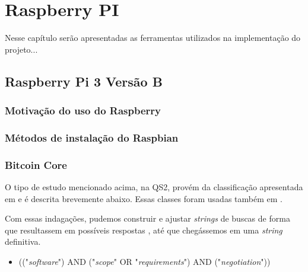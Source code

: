\chapter{Raspberry PI}\label{cap:revisao}

Nesse capítulo serão apresentadas as ferramentas utilizados na implementação do projeto...

\section{Raspberry Pi 3 Versão B}


\subsection{Motivação do uso do Raspberry}


\subsection{Métodos de instalação do Raspbian}


\subsection{Bitcoin Core}


O tipo de estudo mencionado acima, na QS2, provém da classificação apresentada
em \cite{wieringa2006requirements} e é descrita brevemente abaixo. Essas classes
foram usadas também em \cite{Kuhrmann:2015:SPI:2785592.2785600}.
  


Com essas indagações, pudemos construir e ajustar \textit{strings} de buscas de
forma que resultassem em possíveis respostas , até que chegássemos em uma
\textit{string} definitiva.


\begin{itemize}
\setlength{\itemsep}{1pt}
\setlength{\itemindent}{20pt}
\item {(("\textit{software}") AND ("\textit{scope}" OR
"\textit{requirements}") AND ("\textit{negotiation}"))}
\end{itemize}

